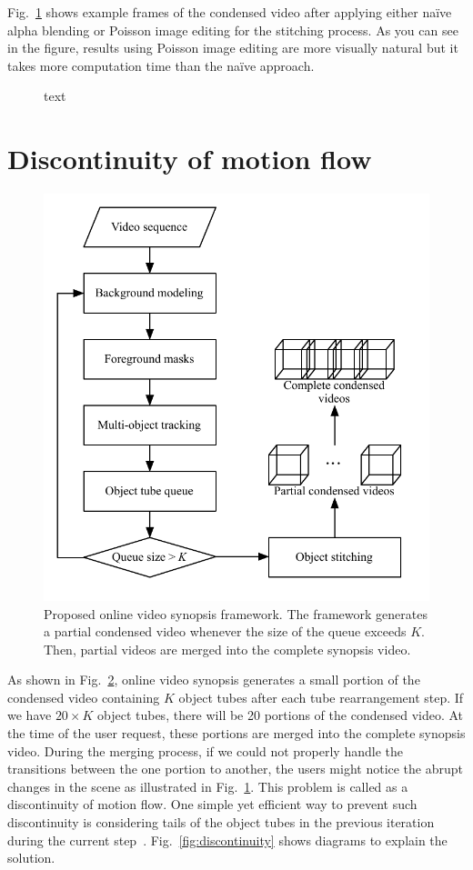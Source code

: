 \documentclass[11pt]{hyu_thesis}
\begin{document}
Fig.~\ref{fig:poisson_fg_bg} shows example frames of the condensed video after applying either na\"ive alpha blending or Poisson image editing for the stitching process. As you can see in the figure, results using Poisson image editing are more visually natural but it takes more computation time than the na\"ive approach.
\begin{figure}
	\centering
	\caption{text}
	\label{fig:poisson_fg_bg}
\end{figure}

\section{Discontinuity of motion flow}
\begin{figure}
	\centering
	\includegraphics[width=0.8\linewidth]{framework.pdf}
	\caption{Proposed online video synopsis framework. The framework generates a partial condensed video whenever the size of the queue exceeds $K$. Then, partial videos are merged into the complete synopsis video.}
	\label{fig:framework}
\end{figure}
As shown in Fig.~\ref{fig:framework}, online video synopsis generates a small portion of the condensed video containing $K$ object tubes after each tube rearrangement step. If we have $20 \times K$ object tubes, there will be 20 portions of the condensed video. At the time of the user request, these portions are merged into the complete synopsis video. During the merging process, if we could not properly handle the transitions between the one portion to another, the users might notice the abrupt changes in the scene as illustrated in Fig.~\ref{}. This problem is called as a discontinuity of motion flow. One simple yet efficient way to prevent such discontinuity is considering tails of the object tubes in the previous iteration during the current step~\cite{}. Fig.~\ref{fig:discontinuity} shows diagrams to explain the solution.
\end{document}
